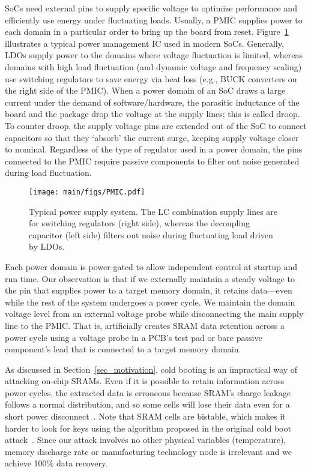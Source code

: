 SoCs need external pins to supply specific voltage to optimize performance and efficiently use energy under fluctuating loads.
Usually, a PMIC supplies power to each domain in a particular order to bring up the board from reset. 
Figure~\ref{fig:pmic} illustrates a typical power management IC used in modern SoCs. 
Generally, LDOs supply power to the domains where voltage fluctuation is limited, whereas domains with high load fluctuation (and dynamic voltage and frequency scaling) use switching regulators to save energy via heat loss (e.g., BUCK converters on the right side of the PMIC). 
When a power domain of an SoC draws a large current under the demand of software/hardware, the parasitic inductance of the board and the package drop the voltage at the supply lines;
this is called droop.
To counter droop, the supply voltage pins are extended out of the SoC to connect capacitors so that they `absorb' the current surge, keeping supply voltage closer to nominal. 
Regardless of the type of regulator used in a power domain, the pins connected to the PMIC require passive components to filter out noise generated during load fluctuation.

\begin{figure}
    \centering
    \texttt{[image: main/figs/PMIC.pdf]}
    \caption{Typical power supply system.  The LC combination supply lines are for switching regulators (right side), whereas the decoupling capacitor (left side) filters out noise during fluctuating load driven by LDOs.}
    \label{fig:pmic}
\end{figure}

Each power domain is power-gated to allow independent control at startup and run time. 
Our observation is that if we externally maintain a steady voltage to the pin that supplies power to a target memory domain, it retains data---even while the rest of the system undergoes a power cycle.  
We maintain the domain voltage level from an external voltage probe while disconnecting the main supply line to the PMIC. 
That is, \sys{} artificially creates SRAM data retention across a power cycle using a voltage probe in a PCB's test pad or bare passive component's lead that is connected to a target memory domain. 

As discussed in Section~\ref{sec_motivation}, cold booting is an impractical way of attacking on-chip SRAMs.   
Even if it is possible to retain information across power cycles, the extracted data is erroneous because SRAM's charge leakage follows a normal distribution, and so some cells will lose their data even for a short power disconnect~\cite{qin2004sram}. Note that SRAM cells are bistable, which makes it harder to look for keys using the algorithm proposed in the original cold boot attack~\cite{halderman2009lest}.  
Since our attack involves no other physical variables (\eg temperature), memory discharge rate or manufacturing technology node is irrelevant and we achieve 100\% data recovery. 

